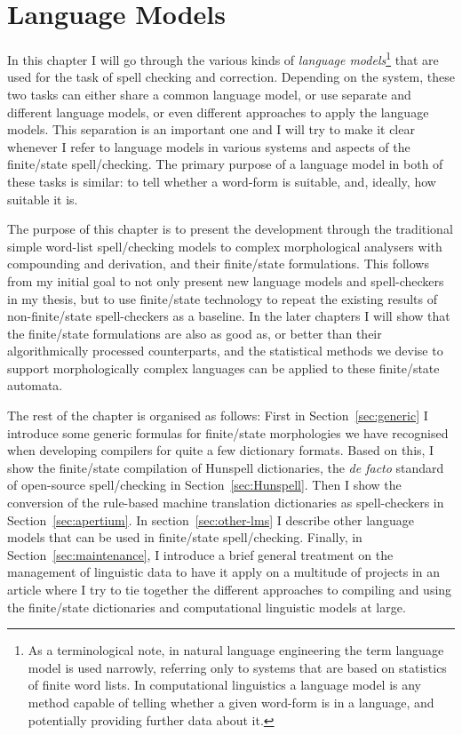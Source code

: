 \documentclass[officiallayout]{unihelcompling}
\begin{document}
\chapter{Language Models}
\label{chap:language-models}

In this chapter I will go through the various kinds of
\emph{language models}\footnote{As a terminological note, in natural language
    engineering the term language model is used narrowly, referring only
    to systems that are based on statistics of finite word lists. In
    computational linguistics a language model is any method capable of
    telling whether a given word-form is in a language, and potentially
    providing further data about it.} that are
used for the task of spell checking and correction.  Depending on the system,
these two tasks can either share a common language model, or use separate and
different language models, or even different approaches to apply the language
models. This separation is an important one and I will try to make it clear
whenever I refer to language models in various systems and aspects of the
finite\-/state spell\-/checking.  The primary purpose of a language model in
both of these tasks is similar: to tell whether a word-form is suitable, and,
ideally, how suitable it is.

The purpose of this chapter is to present the development through the
traditional simple word-list spell\-/checking models to complex morphological
analysers with compounding and derivation, and their finite\-/state formulations.
This follows from my initial goal to not only present new language models and
spell-checkers in my thesis, but to use finite\-/state technology to repeat the
existing results of non-finite\-/state spell-checkers as a baseline. In the later
chapters I will show that the finite\-/state formulations are also as good as, or
better than their algorithmically processed counterparts, and the statistical
methods we devise to support morphologically complex languages can be applied
to these finite\-/state automata.

The rest of the chapter is organised as follows: First in
Section~\ref{sec:generic} I introduce some generic formulas for finite\-/state
morphologies we have recognised when developing compilers for quite a few
dictionary formats. Based on this, I show the finite\-/state compilation of
Hunspell dictionaries, the \emph{de facto} standard of open-source spell\-/checking in
Section~\ref{sec:Hunspell}.  Then I show the conversion of the rule-based
machine translation dictionaries as spell-checkers in
Section~\ref{sec:apertium}. In section~\ref{sec:other-lms} I describe other
language models that can be used in finite\-/state spell\-/checking. Finally, in
Section~\ref{sec:maintenance}, I introduce a brief general treatment on the
management of linguistic data to have it apply on a multitude of projects in an
article where I try to tie together the different approaches to compiling and
using the finite\-/state dictionaries and computational linguistic models at
large.
\end{document}
